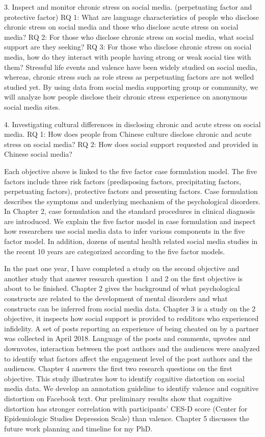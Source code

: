 3. Inspect and monitor chronic stress on social media. (perpetuating factor and protective factor)
RQ 1: What are language characteristics of people who disclose chronic stress on social media and those who disclose acute stress on social media?
RQ 2: For those who disclose chronic stress on social media, what social support are they seeking?
RQ 3: For those who disclose chronic stress on social media, how do they interact with people having strong or weak social ties with them?
Stressful life events and valence have been widely studied on social media, whereas, chronic stress such as role stress as perpetuating factors are not welled studied yet. By using data from social media supporting group or community, we will analyze how people disclose their chronic stress experience on anonymous social media sites.

4. Investigating cultural differences in disclosing chronic and acute stress on social media.
RQ 1: How does people from Chinese culture disclose chronic and acute stress on social media?
RQ 2: How does social support requested and provided in Chinese social media?

Each objective above is linked to the five factor case formulation model. The five factors include three risk factors (predisposing factors, precipitating factors, perpetuating factors), protective factors and presenting factors. Case formulation describes the symptoms and underlying mechanism of the psychological disorders. In Chapter 2, case formulation and the standard procedures in clinical diagnosis are introduced. We explain the five factor model in case formulation and inspect how researchers use social media data to infer various components in the five factor model. In addition, dozens of mental health related social media studies in the recent 10 years are categorized according to the five factor models.

In the past one year, I have completed a study on the second objective and another study that answer research question 1 and 2 on the first objective is about to be finished. Chapter 2 gives the background of what psychological constructs are related to the development of mental disorders and what constructs can be inferred from social media data. Chapter 3 is a study on the 2 objective, it inspects how social support is provided to redditors who experienced infidelity. A set of posts reporting an experience of being cheated on by a partner was collected in April 2018. Language of the posts and comments, upvotes and downvotes, interaction between the post authors and the audiences were analyzed to identify what factors affect the engagement level of the post authors and the audiences. Chapter 4 answers the first two research questions on the first objective. This study illustrates how to identify cognitive distortion on social media data. We develop an annotation guideline to identify valence and cognitive distortion on Facebook text. Our preliminary results show that cognitive distortion has stronger correlation with participants' CES-D score (Center for Epidemiologic Studies Depression Scale) than valence.  Chapter 5 discusses the future work planning and timeline for my PhD.








